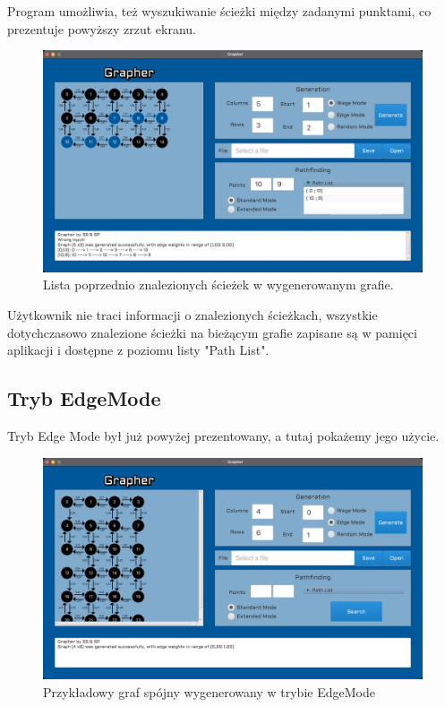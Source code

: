 \documentclass[10pt, a4paper]{report}
\begin{document}
Program umożliwia, też wyszukiwanie ścieżki między zadanymi punktami, co
prezentuje powyższy zrzut ekranu.
\newpage

\begin{figure}[h]
  \begin{center}
    \includegraphics[scale=0.165]{grapherWageModePathList.jpg}
    \caption{Lista poprzednio znalezionych ścieżek w wygenerowanym grafie.}
  \end{center}
\end{figure}

Użytkownik nie traci informacji o znalezionych ścieżkach, wszystkie
dotychczasowo znalezione ścieżki na bieżącym grafie zapisane są w pamięci
aplikacji i dostępne z poziomu listy "Path List".
\newpage

\subsection{Tryb EdgeMode}\label{subsec:wywołania-edgemode}
Tryb Edge Mode był już powyżej prezentowany, a tutaj pokażemy jego użycie.

\begin{figure}[h]
  \begin{center}
    \includegraphics[scale=0.165]{grapherEdgeModeGeneration.jpg}
    \caption{Przykładowy graf spójny wygenerowany w trybie EdgeMode}
  \end{center}
\end{figure}
\end{document}
